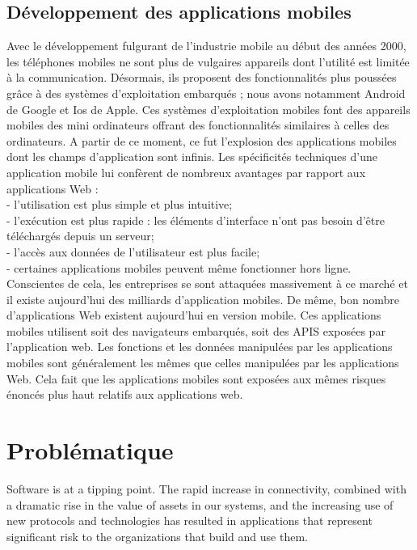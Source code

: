 \subsection{Développement des applications mobiles}
Avec le développement fulgurant de l'industrie mobile au début des années 2000, les téléphones mobiles ne sont plus de vulgaires appareils dont l'utilité est limitée à la communication. Désormais, ils proposent des fonctionnalités plus poussées grâce à des systèmes d'exploitation embarqués ; nous avons notamment Android de Google et Ios de Apple. Ces systèmes d'exploitation mobiles font des appareils mobiles des mini ordinateurs offrant des fonctionnalités similaires à celles des ordinateurs. A partir de ce moment, ce fut l'explosion des applications mobiles dont les champs d'application sont infinis.
Les spécificités techniques d’une application mobile lui confèrent de nombreux avantages par rapport aux applications Web :\\
- l'utilisation est plus simple et plus intuitive; \\
- l’exécution est plus rapide : les éléments d’interface n’ont pas besoin d’être téléchargés depuis un serveur; \\
- l’accès aux données de l’utilisateur est plus facile; \\
- certaines applications mobiles peuvent même fonctionner hors ligne.\\
Conscientes de cela, les entreprises se sont attaquées massivement à ce marché et il existe aujourd'hui des milliards d'application mobiles. De même, bon nombre d'applications Web existent aujourd'hui en version mobile.  Ces applications mobiles utilisent soit des navigateurs embarqués, soit des APIS exposées par l’application web. Les fonctions et les données manipulées par les applications mobiles sont généralement les mêmes que celles manipulées par les applications Web. Cela fait que les applications mobiles sont exposées aux mêmes risques énoncés plus haut relatifs aux applications web.\\

\section{Problématique}



Software is at a tipping point. The rapid increase in connectivity, combined with a dramatic rise in the value of assets in our systems, and the increasing use of new protocols and technologies has resulted in applications that represent significant risk to the organizations that build and use them. 


